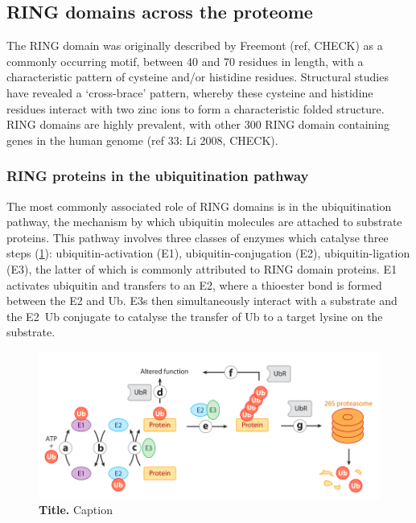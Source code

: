 \documentclass[12pt]{"article"}
\newcommand{\mycaption}[2]{\caption[#1]{\textbf{#1.} #2}}
\begin{document}
\clearpage
\subsection{RING domains across the proteome}

The RING domain was originally described by Freemont (ref, CHECK) as a commonly occurring motif, between 40 and 70 residues in length, with a characteristic pattern of cysteine and/or histidine residues. Structural studies have revealed a ‘cross-brace’ pattern, whereby these cysteine and histidine residues interact with two zinc ions to form a characteristic folded structure. RING domains are highly prevalent, with other 300 RING domain containing genes in the human genome (ref 33: Li 2008, CHECK).\\

\subsubsection{RING proteins in the ubiquitination pathway}

The most commonly associated role of RING domains is in the ubiquitination pathway, the mechanism by which ubiquitin molecules are attached to substrate proteins. This pathway involves three classes of enzymes which catalyse three steps (\cref{fig:ubiquitination_pathway}): ubiquitin-activation (E1), ubiquitin-conjugation (E2), ubiquitin-ligation (E3), the latter of which is commonly attributed to RING domain proteins. E1 activates ubiquitin and transfers to an E2, where a thioester bond is formed between the E2 and Ub. E3s then simultaneously interact with a substrate and the E2~Ub conjugate to catalyse the transfer of Ub to a target lysine on the substrate. \\

\begin{figure}[!h]
\includegraphics[scale=0.95]{ubiquitination_pathway}
\setlength{\abovecaptionskip}{20pt}
\centering
\mycaption{Title}{Caption}
\label{fig:ubiquitination_pathway}
\end{figure}
\end{document}
